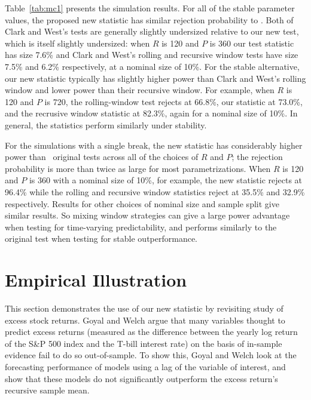 \documentclass[12pt,fleqn]{article}
\begin{document}
Table~\ref{tab:mc1} presents the simulation results.  For all of the
stable parameter values, the proposed new statistic has similar
rejection probability to .  Both of Clark and West's
tests are generally slightly undersized relative to our new test,
which is itself slightly undersized: when $R$ is 120 and $P$ is 360
our test statistic has size 7.6\% and Clark and West's rolling and
recursive window tests have size 7.5\% and 6.2\% respectively, at a
nominal size of 10\%.  For the stable alternative, our new statistic
typically has slightly higher power than Clark and West's rolling
window and lower power than their recursive window.  For example, when
$R$ is 120 and $P$ is 720, the rolling-window test rejects at 66.8\%,
our statistic at 73.0\%, and the recrusive window statistic at 82.3\%,
again for a nominal size of 10\%.  In general, the statistics perform
similarly under stability.

For the simulations with a single break, the new statistic has
considerably higher power than \poscw\ original tests across all of
the choices of $R$ and $P$; the rejection probability is more than
twice as large for most parametrizations.  When $R$ is 120 and $P$ is
360 with a nominal size of 10\%, for example, the new statistic
rejects at 96.4\% while the rolling and recursive window statistics
reject at 35.5\% and 32.9\% respectively.  Results for other choices
of nominal size and sample split give similar results.  So mixing
window strategies can give a large power advantage when testing for
time-varying predictability, and performs similarly to the original
test when testing for stable outperformance.

\section{Empirical Illustration}\label{sec:3}

This section demonstrates the use of our new statistic by revisiting
 study of excess stock returns.  Goyal and Welch argue
that many variables thought to predict excess returns (measured as the
difference between the yearly log return of the S\&P 500 index and the
T-bill interest rate) on the basis of in-sample evidence fail to do so
out-of-sample.  To show this, Goyal and Welch look at the forecasting
performance of models using a lag of the variable of interest, and
show that these models do not significantly outperform the excess
return's recursive sample mean.
\end{document}
